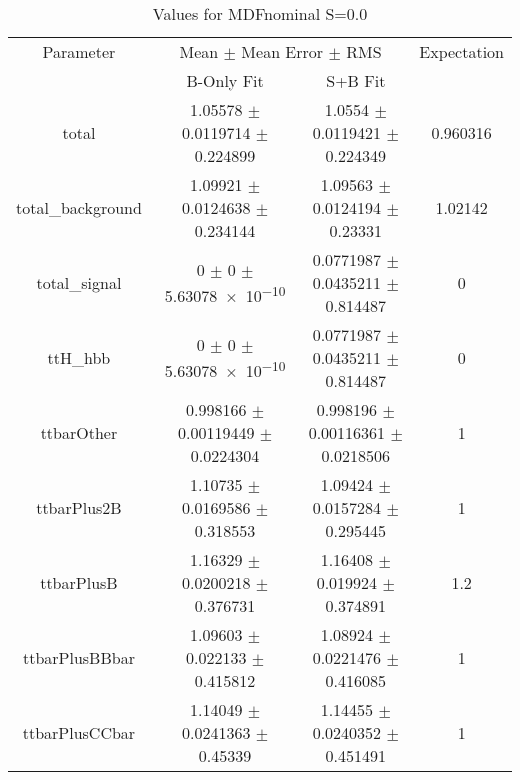 \begin{table}
\centering
\caption{Values for MDFnominal S=0.0}
\begin{tabular}{cccc}
\toprule
Parameter & \multicolumn{2}{c}{Mean $\pm$ Mean Error $\pm$ RMS} & Expectation\\
 & B-Only Fit & S+B Fit & \\
\midrule
total & \num{1.05578} $\pm$ \num{0.0119714} $\pm$ \num{0.224899} & \num{1.0554} $\pm$ \num{0.0119421} $\pm$ \num{0.224349} & \num{0.960316}\\
total\_background & \num{1.09921} $\pm$ \num{0.0124638} $\pm$ \num{0.234144} & \num{1.09563} $\pm$ \num{0.0124194} $\pm$ \num{0.23331} & \num{1.02142}\\
total\_signal & \num{0} $\pm$ \num{0} $\pm$ \num{5.63078e-10} & \num{0.0771987} $\pm$ \num{0.0435211} $\pm$ \num{0.814487} & \num{0}\\
ttH\_hbb & \num{0} $\pm$ \num{0} $\pm$ \num{5.63078e-10} & \num{0.0771987} $\pm$ \num{0.0435211} $\pm$ \num{0.814487} & \num{0}\\
ttbarOther & \num{0.998166} $\pm$ \num{0.00119449} $\pm$ \num{0.0224304} & \num{0.998196} $\pm$ \num{0.00116361} $\pm$ \num{0.0218506} & \num{1}\\
ttbarPlus2B & \num{1.10735} $\pm$ \num{0.0169586} $\pm$ \num{0.318553} & \num{1.09424} $\pm$ \num{0.0157284} $\pm$ \num{0.295445} & \num{1}\\
ttbarPlusB & \num{1.16329} $\pm$ \num{0.0200218} $\pm$ \num{0.376731} & \num{1.16408} $\pm$ \num{0.019924} $\pm$ \num{0.374891} & \num{1.2}\\
ttbarPlusBBbar & \num{1.09603} $\pm$ \num{0.022133} $\pm$ \num{0.415812} & \num{1.08924} $\pm$ \num{0.0221476} $\pm$ \num{0.416085} & \num{1}\\
ttbarPlusCCbar & \num{1.14049} $\pm$ \num{0.0241363} $\pm$ \num{0.45339} & \num{1.14455} $\pm$ \num{0.0240352} $\pm$ \num{0.451491} & \num{1}\\
\bottomrule
\end{tabular}
\end{table}